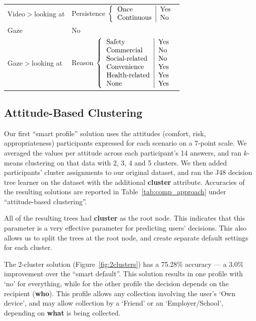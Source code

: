 \begin{table}
\begin{tabular}{ l | l }
		Video$>$looking at 	& Persistence
		$\left\{
		\begin{tabular}{l | l}
		Once & Yes \\
		Continuous & No \\
		\end{tabular}\right.$ \\
		Gaze 				& No			\\
		Gaze$>$looking at 	& Reason
		$\left\{
		\begin{tabular}{l | l}
		Safety & Yes \\
		Commercial & No \\
		Social-related & No \\
		Convenience & Yes \\
		Health-related & Yes \\
		None & Yes \\
		\end{tabular}\right.$ \\
	\end{tabular}
\end{table}


\subsection{Attitude-Based Clustering}
Our first ``smart profile'' solution uses the attitudes (comfort, risk, appropriateness) participants expressed for each scenario on a 7-point scale. We averaged the values per attitude across each participant's 14 answers, and ran $k$-means clustering on that data with 2, 3, 4 and 5 clusters. We then added participants' cluster assignments to our original dataset, and ran the J48 decision tree learner on the dataset with the additional \textbf{cluster} attribute. Accuracies of the resulting solutions are reported in Table~\ref{tab:comp_approach} under ``attitude-based clustering''.


All of the resulting trees had \textbf{cluster} as the root node. This indicates that this parameter is a very effective parameter for predicting users' decisions. This also allows us to split the trees at the root node, and create separate default settings for each cluster.

The 2-cluster solution (Figure~\ref{fig:2clusters}) has a 75.28\% accuracy --- a 3.0\% improvement over the ``smart default''. This solution results in one profile with `no' for everything, while for the other profile the decision depends on the recipient (\textbf{who}). This profile allows any collection involving the user's `Own device', and may allow collection by a `Friend' or an `Employer/School', depending on \textbf{what} is being collected.

